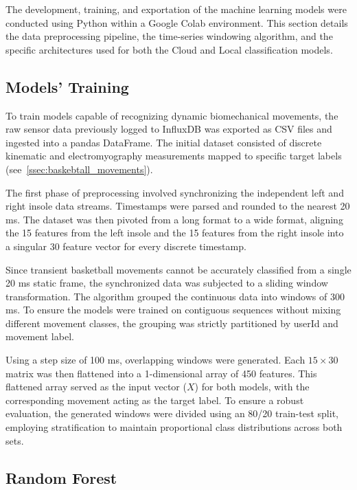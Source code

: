 The development, training, and exportation of the machine learning models were conducted using Python within a Google Colab environment. This section details the data preprocessing pipeline, the time-series windowing algorithm, and the specific architectures used 
for both the Cloud and Local classification models.

\subsection{Models' Training}
\label{ssec:ml_training}

To train models capable of recognizing dynamic biomechanical movements, the raw sensor data previously logged to InfluxDB was exported as CSV files and ingested into a pandas DataFrame. The initial dataset consisted of discrete kinematic and electromyography 
measurements mapped to specific target labels (see~\autoref{ssec:baskebtall_movements}).

The first phase of preprocessing involved synchronizing the independent left and right insole data streams. Timestamps were parsed and rounded to the nearest 20 ms. The dataset was then pivoted from a long format to a wide format, aligning the 15 features from the 
left insole and the 15 features from the right insole into a singular 30 feature vector for every discrete timestamp.

Since transient basketball movements cannot be accurately classified from a single 20 ms static frame, the synchronized data was subjected to a sliding window transformation. The algorithm grouped the continuous data into windows of 300 ms. To ensure the models were 
trained on contiguous sequences without mixing different movement classes, the grouping was strictly partitioned by userId and movement label. 

Using a step size of 100 ms, overlapping windows were generated. Each $15 \times 30$ matrix was then flattened into a 1-dimensional array of 450 features. This flattened array served as the input vector ($X$) for both models, with the corresponding movement acting 
as the target label. To ensure a robust evaluation, the generated windows were divided using an 80/20 train-test split, employing stratification to maintain proportional class distributions across both sets.

\subsection{Random Forest}
\label{ssec:ml_rf}

